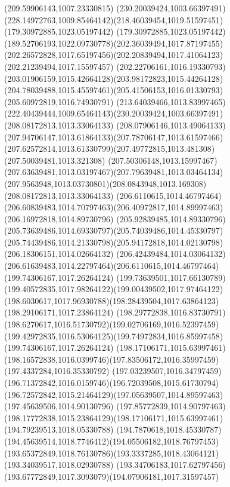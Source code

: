 {{		\lineto(209.59906143,1007.23330815)
		\closepath
		\moveto(230.20039424,1003.66397491)
		\curveto(228.14972763,1009.85464142)(218.46039454,1019.51597451)(179.30972885,1023.05197442)
		\curveto(179.30972885,1023.05197442)(189.52706193,1022.09730778)(202.36039494,1017.87197455)
		\curveto(202.26572828,1017.65197456)(202.20839494,1017.41064123)(202.21239494,1017.15597457)
		\curveto(202.22706161,1016.19330793)(203.01906159,1015.42664128)(203.98172823,1015.44264128)
		\curveto(204.78039488,1015.45597461)(205.41506153,1016.01330793)(205.60972819,1016.74930791)
		\curveto(213.64039466,1013.83997465)(222.40439444,1009.65464143)(230.20039424,1003.66397491)
		\moveto(208.08172813,1013.33064133)
		\curveto(208.07906146,1013.49064133)(207.94706147,1013.61864133)(207.78706147,1013.61597466)
		\curveto(207.62572814,1013.61330799)(207.49772815,1013.481308)(207.50039481,1013.321308)
		\curveto(207.50306148,1013.15997467)(207.63639481,1013.03197467)(207.79639481,1013.03464134)
		\curveto(207.9563948,1013.03730801)(208.0843948,1013.169308)(208.08172813,1013.33064133)
		\moveto(206.6110615,1014.46797464)
		\curveto(206.60839483,1014.70797463)(206.40972817,1014.89997463)(206.16972818,1014.89730796)
		\curveto(205.92839485,1014.89330796)(205.73639486,1014.69330797)(205.74039486,1014.45330797)
		\curveto(205.74439486,1014.21330798)(205.94172818,1014.02130798)(206.18306151,1014.02664132)
		\curveto(206.42439484,1014.03064132)(206.61639483,1014.22797464)(206.6110615,1014.46797464)
		\moveto(199.74306167,1017.26264124)
		\curveto(199.73639501,1017.66130789)(199.40572835,1017.98264122)(199.00439502,1017.97464122)
		\curveto(198.6030617,1017.96930788)(198.28439504,1017.63864123)(198.29106171,1017.23864124)
		\curveto(198.29772838,1016.83730791)(198.6270617,1016.51730792)(199.02706169,1016.52397459)
		\curveto(199.42972835,1016.53064125)(199.74972834,1016.85997458)(199.74306167,1017.26264124)
		\moveto(198.17106171,1015.63997461)
		\curveto(198.16572838,1016.0399746)(197.83506172,1016.35997459)(197.4337284,1016.35330792)
		\curveto(197.03239507,1016.34797459)(196.71372842,1016.0159746)(196.72039508,1015.61730794)
		\curveto(196.72572842,1015.21464129)(197.05639507,1014.89597463)(197.45639506,1014.90130796)
		\curveto(197.85772839,1014.90797463)(198.17772838,1015.23864129)(198.17106171,1015.63997461)
		\moveto(194.79239513,1018.05330788)
		\curveto(194.7870618,1018.45330787)(194.45639514,1018.7746412)(194.05506182,1018.76797453)
		\curveto(193.65372849,1018.76130786)(193.3337285,1018.43064121)(193.34039517,1018.02930788)
		\curveto(193.34706183,1017.62797456)(193.67772849,1017.3093079)(194.07906181,1017.31597457)
}}

